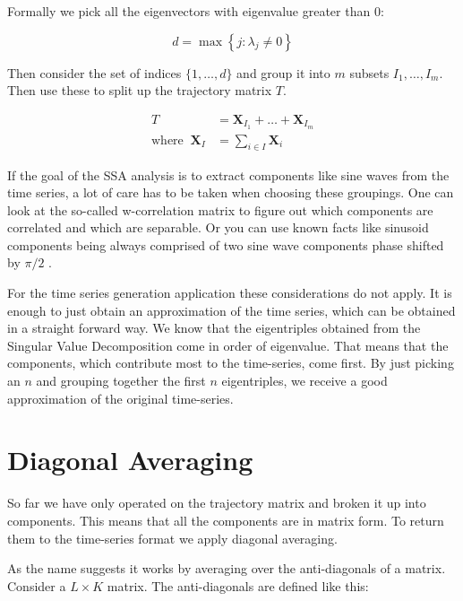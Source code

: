 Formally we pick all the eigenvectors with eigenvalue greater than 0:

\begin{equation}
  d=\max \left\{j: \lambda_{j} \neq 0\right\} 
\end{equation}

Then consider the set of indices $\{1, \ldots, d\}$ and group it into $m$ subsets $I_1, \ldots, I_m$. Then use these to split up the trajectory matrix $T$. 

\begin{equation}
   \begin{aligned}
      T&=\mathbf{X}_{I_{1}}+\ldots+\mathbf{X}_{I_{m}} \\
      \text{where} \;\; \mathbf{X}_{I}&=\sum_{i \in I} \mathbf{X}_{i}
   \end{aligned}
\end{equation}
  
If the goal of the SSA analysis is to extract components like sine waves from the time series, a lot of care has to be taken when choosing these groupings. One can look at the so-called w-correlation matrix to figure out which components are correlated and which are separable. Or you can use known facts like sinusoid components being always comprised of two sine wave components phase shifted by $\pi/2$ \parencite{golyandina2014basic}.

For the time series generation application these considerations do not apply. It is enough to just obtain an approximation of the time series, which can be obtained in a straight forward way. We know that the eigentriples obtained from the Singular Value Decomposition come in order of eigenvalue. That means that the components, which contribute most to the time-series, come first. By just picking an $n$ and grouping together the first $n$ eigentriples, we receive a good approximation of the original time-series.

\section{Diagonal Averaging}

So far we have only operated on the trajectory matrix and broken it up into components. This means that all the components are in matrix form. To return them to the time-series format we apply diagonal averaging. 

As the name suggests it works by averaging over the anti-diagonals of a matrix. Consider a $L\times K$ matrix. The anti-diagonals are defined like this: 

